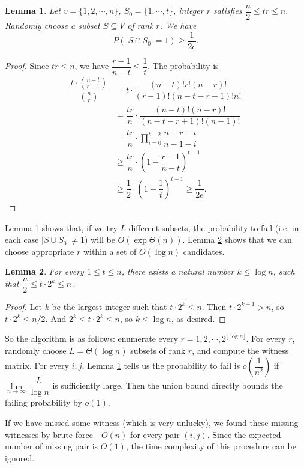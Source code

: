 \documentclass[11pt]{article}
\theoremstyle{plain}
\newtheorem{lemma}{Lemma}[section]
\begin{document}
\begin{lemma}
\label{6}
Let $v=\{1,2,\cdots,n\}$, $S_0=\{1,\cdots,t\}$, integer $r$ satisfies $\dfrac{n}{2}\le tr\le n$. Randomly choose a subset $S\subseteq V$ of rank $r$. We have
$$P(|S\cap S_0|=1)\ge \dfrac{1}{2e}.$$
\end{lemma}
\begin{proof}
Since $tr\le n$, we have $\dfrac{r-1}{n-t}\le \dfrac{1}{t}$. The probability is
\begin{align*}
\dfrac{t\cdot \binom{n-t}{r-1}}{\binom{n}{r}} &= t\cdot \dfrac{(n-t)!r!(n-r)!}{(r-1)!(n-t-r+1)!n!}\\
&= \dfrac{tr}{n}\cdot \dfrac{(n-t)!(n-r)!}{(n-t-r+1)!(n-1)!}\\
&= \dfrac{tr}{n}\cdot \prod\limits_{i=0}^{t-2} \dfrac{n-r-i}{n-1-i}\\
&\ge \dfrac{tr}{n}\cdot \left(1-\dfrac{r-1}{n-t}\right)^{t-1}\\
&\ge \dfrac{1}{2}\cdot \left(1-\dfrac{1}{t}\right)^{t-1} \ge \dfrac{1}{2e}.
\end{align*}
\end{proof}

Lemma \ref{6} shows that, if we try $L$ different subsets, the probability to fail (i.e. in each case $|S\cup S_0|\not=1$) will be $O(\exp{\Theta(n)})$. Lemma \ref{7} shows that we can choose appropriate $r$ within a set of $O(\log n)$ candidates.

\begin{lemma}
\label{7}
For every $1\le t\le n$, there exists a natural number $k\le \log n$, such that $\dfrac{n}{2}\le t\cdot 2^k\le n$.
\end{lemma}
\begin{proof}
Let $k$ be the largest integer such that $t\cdot 2^k\le n$. Then $t\cdot 2^{k+1}>n$, so $t\cdot 2^k\le n/2$. And $2^k\le t\cdot 2^k\le n$, so $k\le \log n$, as desired.
\end{proof}

So the algorithm is as follows: enumerate every $r=1,2,\cdots,2^{\lfloor\log n\rfloor}$. For every $r$, randomly choose $L=\Theta(\log n)$ subsets of rank $r$, and compute the witness matrix. For every $i,j$, Lemma \ref{6} tells us the probability to fail is $o(\dfrac{1}{n^2})$ if $\lim\limits_{n\to \infty}\dfrac{L}{\log n}$ is sufficiently large. Then the union bound directly bounds the failing probability by $o(1)$.

If we have missed some witness (which is very unlucky), we found these missing witnesses by brute-force - $O(n)$ for every pair $(i,j)$. Since the expected number of missing pair is $O(1)$, the time complexity of this procedure can be ignored.
\end{document}
